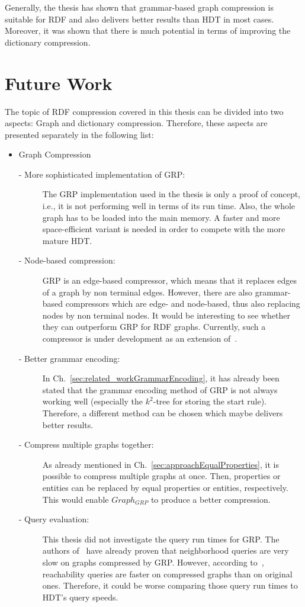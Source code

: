 Generally, the thesis has shown that grammar-based graph compression is suitable for RDF and also delivers better results than HDT in most cases. Moreover, it was shown that there is much potential in terms of improving the dictionary compression.

\section{Future Work}\label{sec:futurework}

The topic of RDF compression covered in this thesis can be divided into two aspects: Graph and dictionary compression. Therefore, these aspects are presented separately in the following list:

\begin{itemize}
	\item Graph Compression
	\begin{description}
		\item [- More sophisticated implementation of GRP:] The GRP implementation used in the thesis is only a proof of concept, i.e., it is not performing well in terms of its run time. Also, the whole graph has to be loaded into the main memory. A faster and more space-efficient variant is needed in order to compete with the more mature HDT.
		\item [- Node-based compression:] GRP is an edge-based compressor, which means that it replaces edges of a graph by non terminal edges. However, there are also grammar-based compressors which are edge- and node-based, thus also replacing nodes by non terminal nodes. It would be interesting to see whether they can outperform GRP for RDF graphs. Currently, such a compressor is under development as an extension of~\cite{mattdk}.
		\item [- Better grammar encoding:] In Ch.~\ref{sec:related_workGrammarEncoding}, it has already been stated that the grammar encoding method of GRP is not always working well (especially the $k^2$-tree for storing the start rule). Therefore, a different method can be chosen which maybe delivers better results.
		\item [- Compress multiple graphs together:] As already mentioned in Ch.~\ref{sec:approachEqualProperties}, it is possible to compress multiple graphs at once. Then, properties or entities can be replaced by equal properties or entities, respectively. This would enable $Graph_{GRP}$ to produce a better compression.
		\item [- Query evaluation:] This thesis did not investigate the query run times for GRP. The authors of~\cite{maneth} have already proven that neighborhood queries are very slow on graphs compressed by GRP. However, according to~\cite{maneth}, reachability queries are faster on compressed graphs than on original ones. Therefore, it could be worse comparing those query run times to HDT's query speeds.

\end{description}
\end{itemize}
